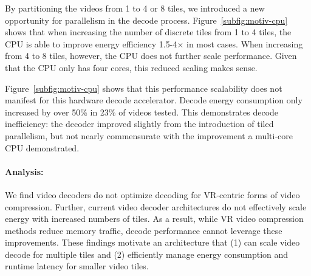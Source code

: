 By partitioning the videos from 1 to 4 or 8 tiles, we introduced a new opportunity for parallelism in the decode process.
Figure~\ref{subfig:motiv-cpu} shows that when increasing the number of discrete tiles from 1 to 4 tiles, the CPU is able to improve energy efficiency 1.5-4$\times$ in most cases.
When increasing from 4 to 8 tiles, however, the CPU does not further scale performance.
Given that the CPU only has four cores, this reduced scaling makes sense.


%
%
Figure~\ref{subfig:motiv-cpu} shows that this performance scalability does not manifest for this hardware decode accelerator.
Decode energy consumption only increased by over 50\% in 23\% of videos tested.
This demonstrates decode inefficiency: the decoder improved slightly from the introduction of tiled parallelism, but not nearly commensurate with the improvement a multi-core CPU demonstrated.

\paragraph{Analysis: } We find video decoders do not optimize decoding for VR-centric forms of video compression.
Further, current video decoder architectures do not effectively scale energy with increased numbers of tiles.
As a result, while VR video compression methods reduce memory traffic, decode performance cannot leverage these improvements.
These findings motivate an architecture that (1) can scale video decode for multiple tiles and (2) efficiently manage energy consumption and runtime latency for smaller video tiles.
